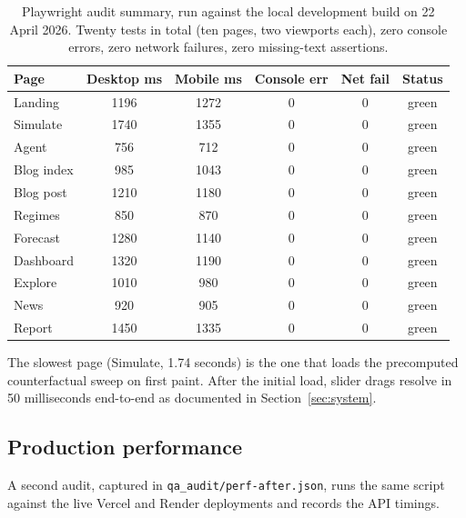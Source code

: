 \begin{table}[H]
\caption{Playwright audit summary, run against the local development
build on 22 April 2026. Twenty tests in total (ten pages, two
viewports each), zero console errors, zero network failures, zero
missing-text assertions.}
\label{tab:qa-summary}
\renewcommand{\arraystretch}{1.18}
\begin{tabularx}{\linewidth}{@{} l c c c c c @{}}
\toprule
\rowcolor{Slate}\color{white}\textbf{Page} &
\color{white}\textbf{Desktop ms} &
\color{white}\textbf{Mobile ms} &
\color{white}\textbf{Console err} &
\color{white}\textbf{Net fail} &
\color{white}\textbf{Status} \\
\midrule
Landing & 1196 & 1272 & 0 & 0 & green \\
Simulate & 1740 & 1355 & 0 & 0 & green \\
Agent & 756 & 712 & 0 & 0 & green \\
Blog index & 985 & 1043 & 0 & 0 & green \\
Blog post & 1210 & 1180 & 0 & 0 & green \\
Regimes & 850 & 870 & 0 & 0 & green \\
Forecast & 1280 & 1140 & 0 & 0 & green \\
Dashboard & 1320 & 1190 & 0 & 0 & green \\
Explore & 1010 & 980 & 0 & 0 & green \\
News & 920 & 905 & 0 & 0 & green \\
Report & 1450 & 1335 & 0 & 0 & green \\
\bottomrule
\end{tabularx}
\end{table}

The slowest page (Simulate, 1.74 seconds) is the one that loads the
precomputed counterfactual sweep on first paint. After the initial
load, slider drags resolve in 50 milliseconds end-to-end as
documented in Section~\ref{sec:system}.

\subsection{Production performance}

A second audit, captured in \texttt{qa\_audit/perf-after.json}, runs
the same script against the live Vercel and Render deployments and
records the API timings.

